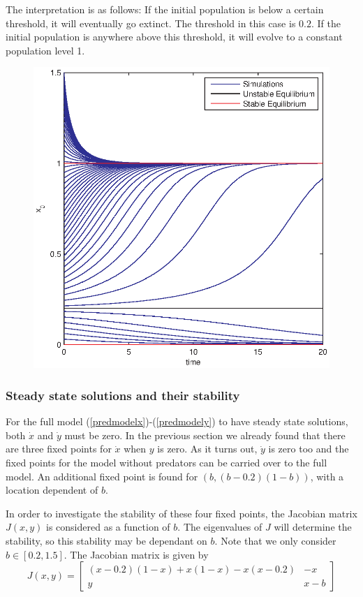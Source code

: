 The interpretation is as follows: If the initial population is below a certain threshold, it will eventually go extinct. The threshold in this case is $0.2$. If the initial population is anywhere above this threshold, it will evolve to a constant population level 1.
\begin{figure}[htp]
\centering
\includegraphics{img/ex3/preyonly.eps}
\caption{}
\label{fig:ex3preyonly}
\end{figure}
\subsubsection{Steady state solutions and their stability}\label{sec:linearstab}
For the full model (\ref{predmodelx})-(\ref{predmodely}) to have steady state solutions, both $\dot{x}$ and $\dot{y}$ must be zero.
In the previous section we already found that there are three fixed points for $\dot{x}$ when $y$ is zero. As it turns out, $\dot{y}$ is zero too and the fixed points for the model without predators can be carried over to the full model. An additional fixed point is found for $(b,(b-0.2)(1-b))$, with a location dependent of $b$. 

In order to investigate the stability of these four fixed points, the Jacobian matrix $J(x,y)$ is considered as a function of $b$. The eigenvalues of $J$ will determine the stability, so this stability may be dependant on $b$. Note that we only consider $b \in [0.2,1.5]$. 
The Jacobian matrix is given by 
\begin{equation}
J(x,y) = \begin{bmatrix} (x-0.2)(1-x)+x(1-x)-x(x-0.2) & -x \\ y & x-b \end{bmatrix}
\end{equation}
